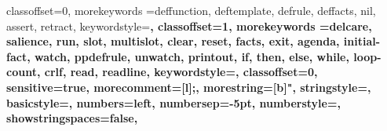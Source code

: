 \usepackage{listings}
\usepackage{xcolor}


%

{
  classoffset=0,
  morekeywords ={deffunction, deftemplate, defrule, deffacts, nil, assert, retract},
  keywordstyle=\bfseries\color{solarized-orange},
  classoffset=1,
  morekeywords ={delcare, salience, run, slot, multislot, clear, reset, facts, exit, agenda, initial-fact, watch, ppdefrule, unwatch, printout, if, then, else, while, loop-count, crlf, read, readline},
  keywordstyle=\bfseries,
  classoffset=0,
  sensitive=true,
  morecomment=[l]{;},
  morestring=[b]{"},
  stringstyle=\color{solarized-grey},
  basicstyle=\scriptsize,%
  numbers=left,
  numbersep=-5pt,
  numberstyle=\tiny,
  showstringspaces=false,
  }

\renewcommand{\ttdefault}{pcr}

\def\truncdiv#1#2{((#1-(#2-1)/2)/#2)}
\def\moduloop#1#2{(#1-\truncdiv{#1}{#2}*#2)}
\def\modulo#1#2{\number\numexpr\moduloop{#1}{#2}\relax}    

\makeatletter

\newcount\netParensCount@clisp

\lst@CCPutMacro
{}%
%
\@empty\z@\@empty
\newcommand\rainbow@clisp[1]{%
  \ifcase\modulo\netParensCount@clisp 5\relax%
  \textcolor{solarized-cyan}{\bfseries#1}%
  \or
  \textcolor{solarized-yellow}{\bfseries#1}%
  \or
  \textcolor{solarized-magenta}{\bfseries#1}%
  \or
  \textcolor{solarized-violet}{\bfseries#1}%
  \else
  \textcolor{solarized-red}{\bfseries#1}%
  \fi
}

